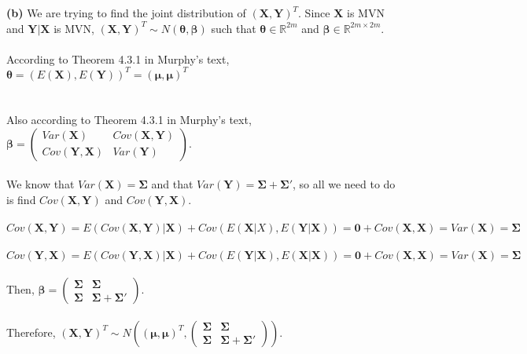 \documentclass[submit]{harvardml}
\newcommand{\R}{\mathbb{R}}
\begin{document}
\textbf{(b)} We are trying to find the joint distribution of $(\mathbf{X},\mathbf{Y})^T$. Since $\mathbf{X}$ is MVN and $\mathbf{Y}|\mathbf{X}$ is MVN, $(\mathbf{X}, \mathbf{Y})^T\sim N(\boldsymbol{\theta}, \boldsymbol{\beta})$ such that $\boldsymbol{\theta}\in \R^{2m}$ and $\boldsymbol{\beta}\in \R^{2m \times 2m}$.\\\\
According to Theorem 4.3.1 in Murphy's text, $\boldsymbol{\theta}=(E(\mathbf{X}),E(\mathbf{Y}))^T=(\boldsymbol{\mu},\boldsymbol{\mu})^T$\\\\\\
Also according to Theorem 4.3.1 in Murphy's text, $\boldsymbol{\beta}=\begin{pmatrix}
Var\left(\mathbf{X}\right)  & Cov\left(\mathbf{X},\mathbf{Y}\right)  \\
Cov\left(\mathbf{Y},\mathbf{X}\right)  & Var\left(\mathbf{Y}\right) 
\end{pmatrix}$.\\\\
We know that $Var(\mathbf{X})=\mathbf{\Sigma}$ and that $Var(\mathbf{Y})=\mathbf{\Sigma}+\mathbf{\Sigma}'$, so all we need to do is find $Cov\left(\mathbf{X},\mathbf{Y}\right)$ and $Cov\left(\mathbf{Y},\mathbf{X}\right)$.\\\\
$Cov(\mathbf{X},\mathbf{Y})=E(Cov(\mathbf{X},\mathbf{Y})|\mathbf{X})+Cov(E(\mathbf{X}|X),E(\mathbf{Y}|\mathbf{X}))=\mathbf{0}+Cov(\mathbf{X},\mathbf{X})=Var(\mathbf{X})=\mathbf{\Sigma}$\\\\
$Cov(\mathbf{Y},\mathbf{X})=E(Cov(\mathbf{Y},\mathbf{X})|\mathbf{X})+Cov(E(\mathbf{Y}|\mathbf{X}),E(\mathbf{X}|\mathbf{X}))=\mathbf{0}+Cov(\mathbf{X},\mathbf{X})=Var(\mathbf{X})=\mathbf{\Sigma}$\\\\
Then, $\boldsymbol{\beta}=\begin{pmatrix}
\mathbf{\Sigma}  & \mathbf{\Sigma}  \\
\mathbf{\Sigma}  & \mathbf{\Sigma}+\mathbf{\Sigma}' 
\end{pmatrix}$.\\\\
Therefore, $(\mathbf{X},\mathbf{Y})^T\sim N((\boldsymbol{\mu},\boldsymbol{\mu})^T,\begin{pmatrix}
\mathbf{\Sigma}  & \mathbf{\Sigma}  \\
\mathbf{\Sigma}  & \mathbf{\Sigma}+\mathbf{\Sigma}' 
\end{pmatrix})$.
\end{document}
